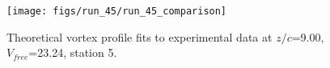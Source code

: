 \begin{figure}[H]
\centering
\texttt{[image: figs/run\_45/run\_45\_comparison]}
\caption{Theoretical vortex profile fits to experimental data at $z/c$=9.00, $V_{free}$=23.24, station 5.}
\label{fig:run_45_comparison}
\end{figure}


